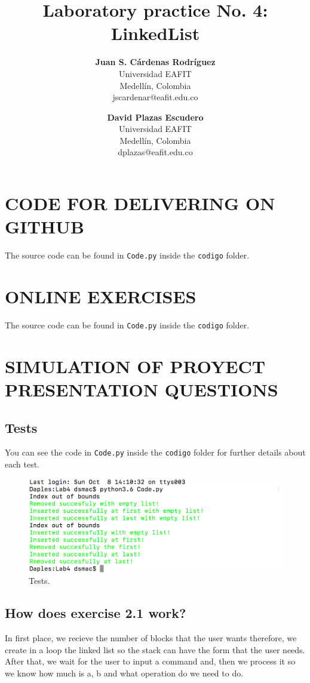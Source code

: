\documentclass[a4paper,12pt]{article}
\title{\color{Eblue}\textbf{Laboratory practice No. 4: LinkedList}}
\author{
  \textbf{Juan S. Cárdenas Rodríguez}\\
  Universidad EAFIT\\
  Medellín, Colombia\\
  jscardenar@eafit.edu.co
\and
  \textbf{David Plazas Escudero}\\
  Universidad EAFIT\\
  Medellín, Colombia\\
  dplazas@eafit.edu.co
}
\begin{document}
  \maketitle
  \thispagestyle{fancy}

  \section{CODE FOR DELIVERING ON GITHUB}
  The source code can be found in \texttt{Code.py} inside the \texttt{codigo} folder.

  \section{ONLINE EXERCISES}
  The source code can be found in \texttt{Code.py} inside the \texttt{codigo} folder.

  \section{SIMULATION OF PROYECT PRESENTATION QUESTIONS}
    \subsection{Tests}
    You can see the code in \texttt{Code.py} inside the \texttt{codigo}
    folder for further details about each test.
      \begin{figure}[H]
        \includegraphics[scale = 0.35]{Tests.png}
        \caption{Tests.}
      \end{figure}
    \subsection{How does exercise 2.1 work?}
    In first place, we recieve the number of blocks that the user wants therefore,
    we create in a loop the linked list so the stack can have the form that the
    user needs. After that, we wait for the user to input a command and, then
    we process it so we know how much is a, b and what operation do we need to do.
\end{document}
